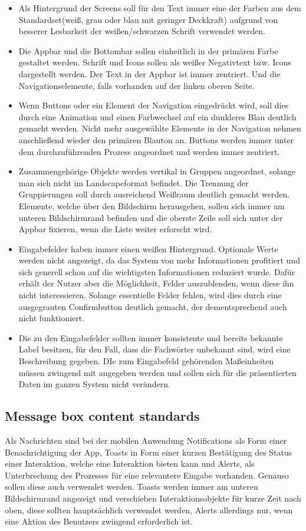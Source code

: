 \begin{itemize}
\item Als Hintergrund der Screens soll für den Text immer eine der Farben aus dem Standardset(weiß, grau oder blau mit geringer Deckkraft) aufgrund von besserer Lesbarkeit der weißen/schwarzen Schrift verwendet werden.
\item Die Appbar und die Bottombar sollen einheitlich in der primären Farbe gestaltet werden. Schrift und Icons sollen als weißer Negativtext bzw. Icons dargestellt werden. Der Text in der Appbar ist immer zentriert. Und die Navigationselemente, falls vorhanden auf der linken oberen Seite.
\item Wenn Buttons oder ein Element der Navigation eingedrückt wird, soll dies durch eine Animation und einen Farbwechsel auf ein dunkleres Blau deutlich gemacht werden. Nicht mehr ausgewählte Elemente in der Navigation nehmen anschließend wieder den primären Blauton an. Buttons werden immer unter dem durchzuführenden Prozess angeordnet und werden immer zentriert.
\item Zusammengehörige Objekte werden vertikal in Gruppen angeordnet, solange man sich nicht im Landscapeformat befindet. Die Trennung der Gruppierungen soll durch ausreichend Weißraum deutlich gemacht werden. Elemente, welche über den Bildschirm herausgehen, sollen sich immer am unteren Bildschirmrand befinden und die oberste Zeile soll sich unter der Appbar fixieren, wenn die Liste weiter erforscht wird.
\item Eingabefelder haben immer einen weißen Hintergrund. Optionale Werte werden nicht angezeigt, da das System von mehr Informationen profitiert und sich generell schon auf die wichtigsten Informationen reduziert wurde. Dafür erhält der Nutzer aber die Möglichkeit, Felder auszublenden, wenn diese ihn nicht interessieren. Solange essentielle Felder fehlen, wird dies durch eine ausgegrauten Confirmbutton deutlich gemacht, der dementsprechend auch nicht funktioniert.
\item Die zu den Eingabefelder sollten immer konsistente und bereits bekannte Label besitzen, für den Fall, dass die Fachwörter unbekannt sind, wird eine Beschreibung gegeben. DIe zum Eingabefeld gehörenden Maßeinheiten müssen zwingend mit angegeben werden und sollen sich für die präsentierten Daten im ganzen System nicht verändern. 
\end{itemize}

\subsection{Message box content standards}
Als Nachrichten sind bei der mobilen Anwendung Notifications als Form einer Benachrichtigung der App, Toasts in Form einer kurzen Bestätigung des Status einer Interaktion, welche eine Interaktion bieten kann und Alerts, als Unterbrechung des Prozesses für eine relevantere Eingabe vorhanden. Genauso sollen diese auch verwendet werden. 
Toasts werden immer am unteren Bildschirmrand angezeigt und verschieben Interaktionsobjekte für kurze Zeit nach oben, diese sollten hauptsächlich verwendet werden, Alerts allerdings nur, wenn eine Aktion des Benutzers zwingend erforderlich ist.

